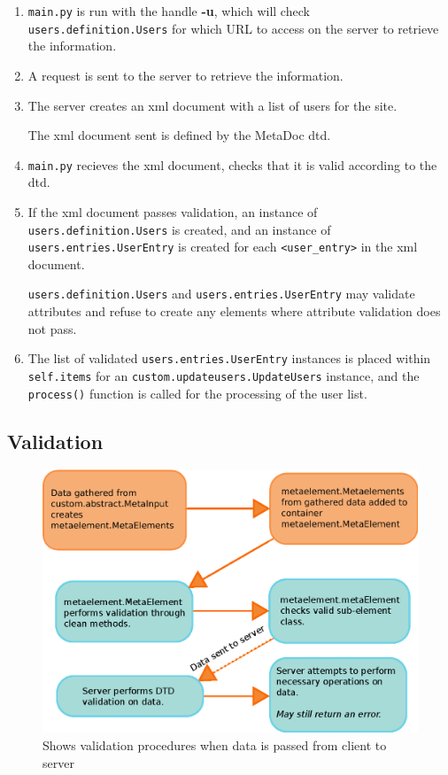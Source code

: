 \begin{enumerate}
    \item
        \texttt{main.py} is run with the handle \textbf{-u}, which will check
        \texttt{users.definition.Users} for which URL to access on the server
        to retrieve the information.
    \item
        A request is sent to the server to retrieve the information.
    \item
        The server creates an \gls{xml} document with a list of users for the
        site.
        
        The \gls{xml} document sent is defined by the MetaDoc \gls{dtd}.
    \item
        \texttt{main.py} recieves the \gls{xml} document, checks that it is
        valid according to the \gls{dtd}. 
    \item
        If the \gls{xml} document passes validation, an instance of
        \texttt{users.definition.Users} is created, and an instance of
        \texttt{users.entries.UserEntry} is created for each
        \texttt{<user\_entry>} in the \gls{xml} document.

        \texttt{users.definition.Users} and \texttt{users.entries.UserEntry}
        may validate attributes and refuse to create any elements where
        attribute validation does not pass.
    \item
        The list of validated \texttt{users.entries.UserEntry} instances is
        placed within \texttt{self.items} for an
        \texttt{custom.updateusers.UpdateUsers} instance, and the
        \texttt{process()} function is called for the processing of the user
        list.
\end{enumerate}

\subsection{Validation}

\begin{figure}[h!]
    \includegraphics[width=\textwidth]{img/site_information_flow}
    \caption{Shows validation procedures when data is passed from client to
    server}
    \label{fig:site_information_flow}
\end{figure}

